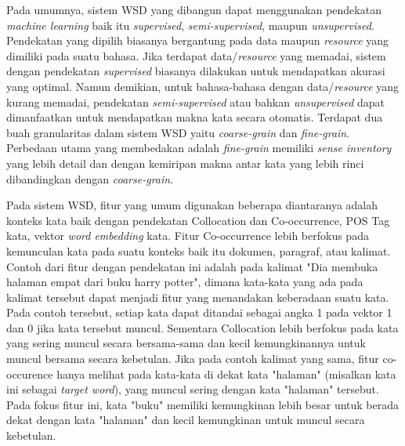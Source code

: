 Pada umumnya, sistem WSD yang dibangun dapat menggunakan pendekatan \textit{machine learning} baik itu \textit{supervised}, \textit{semi-supervised}, maupun \textit{unsupervised}. Pendekatan yang dipilih biasanya bergantung pada data maupun \textit{resource} yang dimiliki pada suatu bahasa. Jika terdapat data/\textit{resource} yang memadai, sistem dengan pendekatan \textit{supervised} biasanya dilakukan untuk mendapatkan akurasi yang optimal. Namun demikian, untuk bahasa-bahasa dengan data/\textit{resource} yang kurang memadai, pendekatan \textit{semi-supervised} atau bahkan \textit{unsupervised} dapat dimanfaatkan untuk mendapatkan makna kata secara otomatis. Terdapat dua buah granularitas dalam sistem WSD yaitu \textit{coarse-grain} dan \textit{fine-grain}. Perbedaan utama yang membedakan adalah \textit{fine-grain} memiliki \textit{sense inventory} yang lebih detail dan dengan kemiripan makna antar kata yang lebih rinci dibandingkan dengan \textit{coarse-grain}. 

Pada sistem WSD, fitur yang umum digunakan beberapa diantaranya adalah konteks kata baik dengan pendekatan Collocation dan Co-occurrence, POS Tag kata, vektor \textit{word embedding} kata. Fitur Co-occurrence lebih berfokus pada kemunculan kata pada suatu konteks baik itu dokumen, paragraf, atau kalimat. Contoh dari fitur dengan pendekatan ini adalah pada kalimat "Dia membuka halaman empat dari buku harry potter", dimana kata-kata yang ada pada kalimat tersebut dapat menjadi fitur yang menandakan keberadaan suatu kata. Pada contoh tersebut, setiap kata dapat ditandai sebagai angka 1 pada vektor 1 dan 0 jika kata tersebut muncul. Sementara Collocation lebih berfokus pada kata yang sering muncul secara bersama-sama dan kecil kemungkinannya untuk muncul bersama secara kebetulan. Jika pada contoh kalimat yang sama, fitur co-occurence hanya melihat pada kata-kata di dekat kata "halaman" (misalkan kata ini sebagai \textit{target word}), yang muncul sering dengan kata "halaman" tersebut. Pada fokus fitur ini, kata "buku" memiliki kemungkinan lebih besar untuk berada dekat dengan kata "halaman" dan kecil kemungkinan untuk muncul secara kebetulan.


